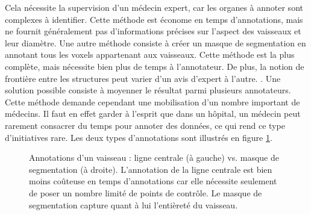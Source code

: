  Cela nécessite la supervision d'un médecin expert, car les organes à annoter sont complexes à identifier.  Cette méthode est économe en temps d'annotations, mais ne fournit généralement pas d'informations précises sur l'aspect des vaisseaux et leur diamètre. 
Une autre méthode consiste à créer un masque de segmentation en annotant tous les voxels appartenant aux vaisseaux. Cette méthode est la plus complète, mais nécessite bien plus de temps à l'annotateur. De plus, la notion de frontière entre les structures peut varier d'un avis d'expert à l'autre. . Une solution possible consiste à moyenner le résultat parmi plusieurs annotateurs. Cette méthode demande cependant une mobilisation d'un nombre important de médecins. Il faut en effet garder à l'esprit que dans un hôpital, un médecin peut rarement consacrer du temps pour annoter des données, ce qui rend ce type d'initiatives rare. Les deux types d'annotations sont illustrés en figure \ref{fig:annotations}. 
\begin{figure}
    \caption{Annotations d'un vaisseau : ligne centrale (à gauche) vs. masque de segmentation (à droite). L'annotation de la ligne centrale est bien moins coûteuse en temps d'annotations car elle nécessite seulement de poser un nombre limité de points de contrôle. Le masque de segmentation capture quant à lui l'entièreté du vaisseau.}
    \label{fig:annotations}
\end{figure}


